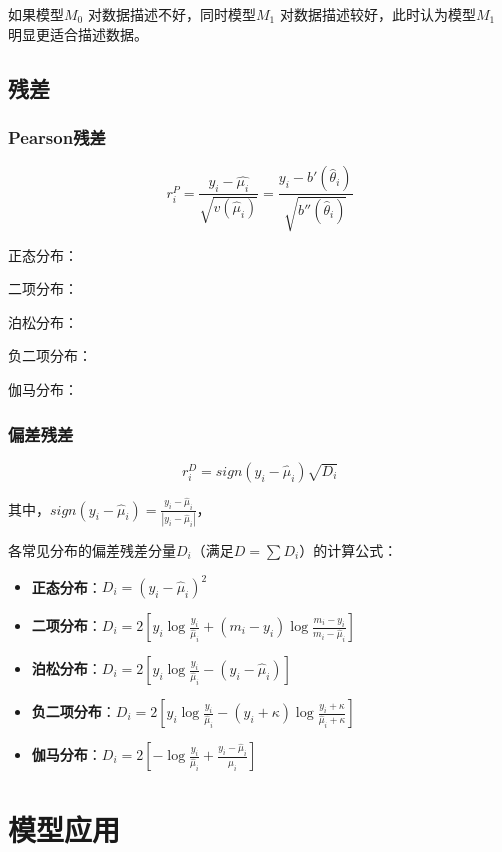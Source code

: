 \documentclass[
]{book}
\providecommand{\tightlist}{%
  \setlength{\itemsep}{0pt}\setlength{\parskip}{0pt}}
\begin{document}
如果模型\(M_0\) 对数据描述不好，同时模型\(M_1\) 对数据描述较好，此时认为模型\(M_1\) 明显更适合描述数据。

\subsection{残差}\label{ux6b8bux5dee}

\subsubsection{Pearson残差}\label{pearsonux6b8bux5dee}

\[
r_i^P=\frac{y_i-\hat{\mu_i}}{\sqrt{v(\hat{\mu}_i)}}=\frac{y_i-b'(\hat{\theta}_i)}{\sqrt{b''(\hat{\theta}_i)}}
\]

正态分布：

二项分布：

泊松分布：

负二项分布：

伽马分布：

\subsubsection{偏差残差}\label{ux504fux5deeux6b8bux5dee}

\[
r_i^D=sign(y_i-\hat{\mu}_i)\sqrt{D_i}
\]

其中，\(sign(y_i-\hat{\mu}_i)=\frac{y_i-\hat{\mu}_i}{|y_i-\hat{\mu}_i|}\)，

各常见分布的偏差残差分量\(D_i\)（满足\(D = \sum D_i\)）的计算公式：

\begin{itemize}
\tightlist
\item
  \textbf{正态分布}：\(D_i = (y_i - \hat{\mu}_i)^2\)
\item
  \textbf{二项分布}：\(D_i = 2\left[y_i \log\frac{y_i}{\hat{\mu}_i} + (m_i - y_i) \log\frac{m_i - y_i}{m_i - \hat{\mu}_i}\right]\)
\item
  \textbf{泊松分布}：\(D_i = 2\left[y_i \log\frac{y_i}{\hat{\mu}_i} - (y_i - \hat{\mu}_i)\right]\)
\item
  \textbf{负二项分布}：\(D_i = 2\left[y_i \log\frac{y_i}{\hat{\mu}_i} - (y_i + \kappa) \log\frac{y_i + \kappa}{\hat{\mu}_i + \kappa}\right]\)
\item
  \textbf{伽马分布}：\(D_i = 2\left[-\log\frac{y_i}{\hat{\mu}_i} + \frac{y_i - \hat{\mu}_i}{\hat{\mu}_i}\right]\)
\end{itemize}

\section{模型应用}\label{ux6a21ux578bux5e94ux7528}
\end{document}
